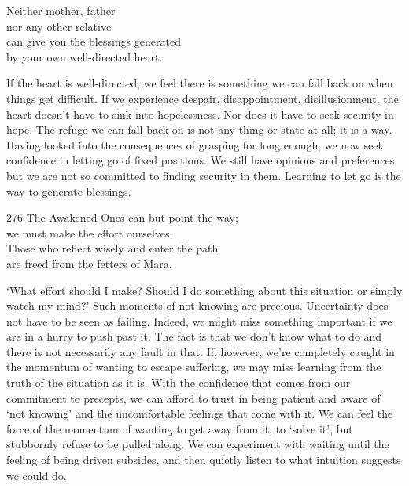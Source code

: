 
\begin{dhpVerse}{43}
\label{dhp-43}
Neither mother, father\\
nor any other relative\\
can give you the blessings generated\\
by your own well-directed heart.
\end{dhpVerse}

\begin{dhpRefl}
  If the heart is well-directed, we feel there is something we can fall back on
  when things get difficult. If we experience despair, disappointment,
  disillusionment, the heart doesn’t have to sink into hopelessness. Nor does it
  have to seek security in hope. The refuge we can fall back on is not any thing
  or state at all; it is a way. Having looked into the consequences of grasping
  for long enough, we now seek confidence in letting go of fixed positions. We
  still have opinions and preferences, but we are not so committed to finding
  security in them. Learning to let go is the way to generate blessings.
\end{dhpRefl}


\begin{dhpVerse}{276}
\label{dhp-276}
The Awakened Ones can but point the way;\\
we must make the effort ourselves.\\
Those who reflect wisely and enter the path\\
are freed from the fetters of Mara.
\end{dhpVerse}

\begin{dhpRefl}
  `What effort should I make? Should I do something about this situation or
  simply watch my mind?' Such moments of not-knowing are precious. Uncertainty
  does not have to be seen as failing. Indeed, we might miss something important
  if we are in a hurry to push past it. The fact is that we don't know what to
  do and there is not necessarily any fault in that. If, however, we're
  completely caught in the momentum of wanting to escape suffering, we may miss
  learning from the truth of the situation as it is. With the confidence that
  comes from our commitment to precepts, we can afford to trust in being patient
  and aware of `not knowing' and the uncomfortable feelings that come with it.
  We can feel the force of the momentum of wanting to get away from it, to
  `solve it', but stubbornly refuse to be pulled along. We can experiment with
  waiting until the feeling of being driven subsides, and then quietly listen to
  what intuition suggests we could do.
\end{dhpRefl}

